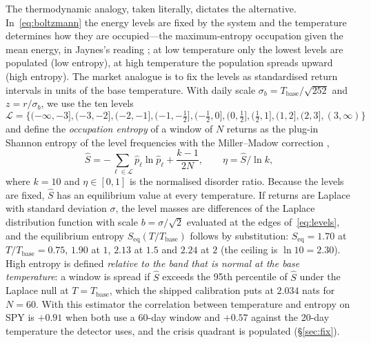\documentclass[11pt]{article}
\newcommand{\Tb}{T_{\mathrm{base}}}
\begin{document}
The thermodynamic analogy, taken literally, dictates the alternative. In~\eqref{eq:boltzmann} the energy levels are fixed by the system and the temperature determines how they are occupied---the maximum-entropy occupation given the mean energy, in Jaynes's reading \citep{jaynes1957}; at low temperature only the lowest levels are populated (low entropy), at high temperature the population spreads upward (high entropy). The market analogue is to fix the levels as standardised return intervals in units of the base temperature. With daily scale $\sigma_b=\Tb/\sqrt{252}$ and $z=r/\sigma_b$, we use the ten levels
\begin{equation}
\mathcal{L}=\{(-\infty,-3],(-3,-2],(-2,-1],(-1,-\tfrac12],(-\tfrac12,0],(0,\tfrac12],(\tfrac12,1],(1,2],(2,3],(3,\infty)\} \label{eq:levels}
\end{equation}
and define the \emph{occupation entropy} of a window of $N$ returns as the plug-in Shannon entropy \citep{shannon1948} of the level frequencies with the Miller--Madow correction \citep{miller1955,paninski2003},
\begin{equation}
\hat S=-\sum_{\ell\in\mathcal L}\hat p_\ell\ln\hat p_\ell+\frac{k-1}{2N},\qquad \eta=\hat S/\ln k, \label{eq:occ}
\end{equation}
where $k=10$ and $\eta\in[0,1]$ is the normalised disorder ratio. Because the levels are fixed, $\hat S$ has an equilibrium value at every temperature. If returns are Laplace with standard deviation $\sigma$, the level masses are differences of the Laplace distribution function with scale $b=\sigma/\sqrt2$ evaluated at the edges of~\eqref{eq:levels}, and the equilibrium entropy $S_{\mathrm{eq}}(T/\Tb)$ follows by substitution: $S_{\mathrm{eq}}=1.70$ at $T/\Tb=0.75$, $1.90$ at $1$, $2.13$ at $1.5$ and $2.24$ at $2$ (the ceiling is $\ln10=2.30$). High entropy is defined \emph{relative to the band that is normal at the base temperature}: a window is spread if $\hat S$ exceeds the 95th percentile of $\hat S$ under the Laplace null at $T=\Tb$, which the shipped calibration puts at $2.034$ nats for $N=60$. With this estimator the correlation between temperature and entropy on SPY is $+0.91$ when both use a 60-day window and $+0.57$ against the 20-day temperature the detector uses, and the crisis quadrant is populated (\S\ref{sec:fix}).
\end{document}
